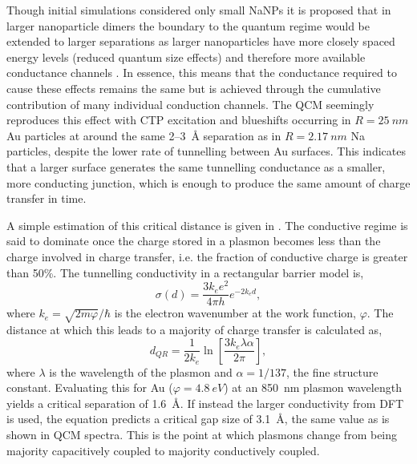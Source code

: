 \documentclass{article}
\begin{document}
Though initial simulations considered only small NaNPs it is proposed that in larger nanoparticle dimers the boundary to the quantum regime would be extended to larger separations as larger nanoparticles have more closely spaced energy levels (reduced quantum size effects) and therefore more available conductance channels \cite{zuloaga2009}. In essence, this means that the conductance required to cause these effects remains the same but is achieved through the cumulative contribution of many individual conduction channels. The QCM seemingly reproduces this effect with CTP excitation and blueshifts occurring in $R=\SI{25}{nm}$ Au particles at around the same 2--\SI{3}{\angstrom} separation as in $R=\SI{2.17}{nm}$ Na particles, despite the lower rate of tunnelling between Au surfaces. This indicates that a larger surface generates the same tunnelling conductance as a smaller, more conducting junction, which is enough to produce the same amount of charge transfer in time.

A simple estimation of this critical distance is given in \cite{savage2012}. The conductive regime is said to dominate once the charge stored in a plasmon becomes less than the charge involved in charge transfer, i.e. the fraction of conductive charge is greater than 50\%. The tunnelling conductivity in a rectangular barrier model is,
\begin{equation}
	\sigma(d) = \frac{3k_ee^2}{4\pi h} e^{-2k_e d},
\end{equation}
where $k_e=\sqrt{2m\varphi}/\hbar$ is the electron wavenumber at the work function, $\varphi$. The distance at which this leads to a majority of charge transfer is calculated as,
\begin{equation}
	d_{QR} = \frac{1}{2k_e}\ln\left[ \frac{3k_e\lambda\alpha}{2\pi} \right],
\end{equation}
where $\lambda$ is the wavelength of the plasmon and $\alpha=1/137$, the fine structure constant. Evaluating this for Au ($\varphi=\SI{4.8}{eV}$) at an \SI{850}{nm} plasmon wavelength yields a critical separation of \SI{1.6}{\angstrom}. If instead the larger conductivity from DFT is used, the equation predicts a critical gap size of \SI{3.1}{\angstrom}, the same value as is shown in QCM spectra. This is the point at which plasmons change from being majority capacitively coupled to majority conductively coupled.
\end{document}
